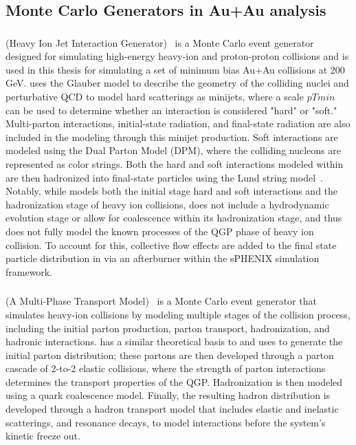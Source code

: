 \subsection{Monte Carlo Generators in Au+Au analysis}
\label{sec:auau_generators}
\subsubsection{\hijing}
\hijing (Heavy Ion Jet Interaction Generator)~\cite{hijing} is a Monte Carlo event generator designed for simulating high-energy heavy-ion and proton-proton collisions and is used in this thesis for simulating a set of minimum bias Au+Au collisions at 200 GeV. 
\hijing uses the Glauber model to describe the geometry of the colliding nuclei and perturbative QCD to model hard scatterings as minijets, where a scale $pTmin$ can be used to determine whether an interaction is considered "hard" or "soft."
Multi-parton interactions, initial-state radiation, and final-state radiation are also included in the modeling through this minijet production.
Soft interactions are modeled using the Dual Parton Model (DPM), where the colliding nucleons are represented as color strings.
Both the hard and soft interactions modeled within \hijing are then hadronized into final-state particles using the Lund string model~\cite{lund_frag_model,lund_frag_model_sjostrand}.
Notably, while \hijing models both the initial stage hard and soft interactions and the hadronization stage of heavy ion collisions, \hijing does not include a hydrodynamic evolution stage or allow for coalescence within its hadronization stage, and thus does not fully model the known processes of the QGP phase of heavy ion collision.
To account for this, collective flow effects are added to the final state particle distribution in \hijing via an afterburner within the sPHENIX \geant simulation framework.

\subsubsection{\ampt}
\ampt (A Multi-Phase Transport Model)~\cite{ampt} is a Monte Carlo event generator that simulates heavy-ion collisions by modeling multiple stages of the collision process, including the initial parton production, parton transport, hadronization, and hadronic interactions.
\ampt has a similar theoretical basis to \hijing and uses \hijing to generate the initial parton distribution; these partons are then developed through a parton cascade of 2-to-2 elastic collisions, where the strength of parton interactions determines the transport properties of the QGP.
Hadronization is then modeled using a quark coalescence model. 
Finally, the resulting hadron distribution is developed through a hadron transport model that includes elastic and inelastic scatterings, and resonance decays, to model interactions before the system's kinetic freeze out.
